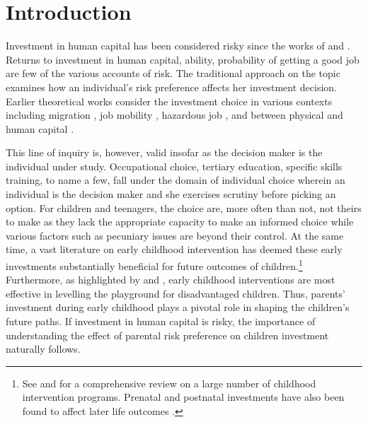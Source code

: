 \documentclass[emulatestandardclasses, 10pt, abstract = true]{scrartcl}
\begin{document}
\section{Introduction}
Investment in human capital has been considered risky since the works of \citet{becker1962investment, levhari1974effect} and \citet{schultz1971investment}. Returns to investment in human capital, ability, probability of getting a good job are few of the various accounts of risk. The traditional approach on the topic examines how an individual's risk preference affects her investment decision. Earlier theoretical works consider the investment choice in various contexts including migration \citep{david1974fortune}, job mobility \citep{johnson1978theory}, hazardous job \citep{thaler1976value}, and between physical and human capital \citep{levhari1974effect}. 

This line of inquiry is, however, valid insofar as the decision maker is the individual under study. Occupational choice, tertiary education, specific skills training, to name a few, fall under the domain of individual choice wherein an individual is the decision maker and she exercises scrutiny before picking an option. For children and teenagers, the choice are, more often than not, not theirs to make as they lack the appropriate capacity to make an informed choice while various factors such as pecuniary issues are beyond their control. At the same  time, a vast literature on early childhood intervention has deemed these early investments substantially beneficial for future outcomes of children.\footnote{See \citet{Currie2001} and \citet{NORES2010} for a comprehensive review on a large number of childhood intervention programs. Prenatal and postnatal investments have also been found to affect later life outcomes \citep{currie2011human, almond2011killing, currie2013early}.} Furthermore, as highlighted by \citet{jacob2008improving} and \citet{duflo2011poor}, early childhood interventions are most effective in levelling the playground for disadvantaged children. Thus, parents' investment during early childhood plays a pivotal role in shaping the children's future paths. If investment in human capital is risky, the importance of understanding the effect of parental risk preference on children investment naturally follows. 
    
\end{document}
